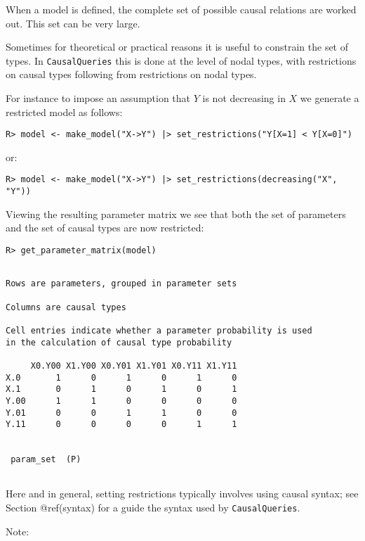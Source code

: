 \documentclass[
  11pt,
  article]{jss}
\begin{document}
When a model is defined, the complete set of possible causal relations
are worked out. This set can be very large.

Sometimes for theoretical or practical reasons it is useful to constrain
the set of types. In \texttt{CausalQueries} this is done at the level of
nodal types, with restrictions on causal types following from
restrictions on nodal types.

For instance to impose an assumption that \(Y\) is not decreasing in
\(X\) we generate a restricted model as follows:

\begin{verbatim}
R> model <- make_model("X->Y") |> set_restrictions("Y[X=1] < Y[X=0]")
\end{verbatim}

or:

\begin{verbatim}
R> model <- make_model("X->Y") |> set_restrictions(decreasing("X", "Y"))
\end{verbatim}

Viewing the resulting parameter matrix we see that both the set of
parameters and the set of causal types are now restricted:

\begin{verbatim}
R> get_parameter_matrix(model)
\end{verbatim}

\begin{verbatim}

Rows are parameters, grouped in parameter sets

Columns are causal types

Cell entries indicate whether a parameter probability is used
in the calculation of causal type probability

     X0.Y00 X1.Y00 X0.Y01 X1.Y01 X0.Y11 X1.Y11
X.0       1      0      1      0      1      0
X.1       0      1      0      1      0      1
Y.00      1      1      0      0      0      0
Y.01      0      0      1      1      0      0
Y.11      0      0      0      0      1      1

 
 param_set  (P)
 
\end{verbatim}

Here and in general, setting restrictions typically involves using
causal syntax; see Section @ref(syntax) for a guide the syntax used by
\texttt{CausalQueries}.

Note:
\end{document}
